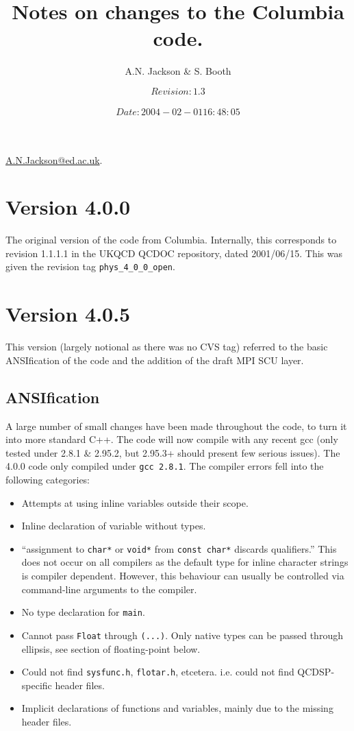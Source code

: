 \documentclass[12pt]{article}
\title{Notes on changes to the Columbia code.}
\author{A.N. Jackson \& S. Booth}
\date{\mbox{\small $$Revision: 1.3 $$  $$Date: 2004-02-01 16:48:05 $$}}
\newcommand{\cde}[1]{{\tt #1}}            %
\begin{document}
\maketitle

\begin{flushright}
\href{mailto:A.N.Jackson@ed.ac.uk}{A.N.Jackson@ed.ac.uk}.
\end{flushright}

\tableofcontents

\newpage

\section{Version 4.0.0}
The original version of the code from Columbia.  Internally, this corresponds
to revision 1.1.1.1 in the UKQCD QCDOC repository, dated 2001/06/15.  
This was given the revision tag \cde{phys\_4\_0\_0\_open}. 

\section{Version 4.0.5}
This version (largely notional as there was no CVS tag) referred to the basic
ANSIfication of the code and the addition of the draft MPI SCU layer.

\subsection{ANSIfication}
\label{405ANSI}
A large number of small changes have been made throughout the code, to
turn it into more standard C++.  The code will now compile with any recent gcc
(only tested under 2.8.1 \& 2.95.2, but 2.95.3+ should present few serious
issues).  The 4.0.0 code only compiled under \cde{gcc 2.8.1}.  The compiler errors
fell into the following categories:
\begin{itemize}
 \item Attempts at using inline variables outside their scope.
 \item Inline declaration of variable without types.  
 \item ``assignment to \cde{char*} or \cde{void*} from \cde{const char*}
 discards qualifiers.''  This does not occur on all compilers as the default
 type for inline character strings is compiler dependent.  However, this behaviour 
 can usually be controlled via command-line arguments to the compiler.
 \item No type declaration for \cde{main}.
 \item Cannot pass \cde{Float} through \cde{(...)}.  Only native types can be
 passed through ellipsis, see section of floating-point below.
 \item Could not find \cde{sysfunc.h}, \cde{flotar.h},
 etcetera. i.e. could not find QCDSP-specific header files.
 \item Implicit declarations of functions and variables, mainly due
 to the missing header files.
\end{itemize}
\end{document}

